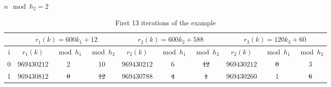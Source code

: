 \documentclass{article}
\begin{document}
{%
$n \mod h_2 = 2$ 
\begin{table}[H]
\centering
\caption{First 13 iterations of the example}
\label{table:b}
\begin{tabular}{|c|c|@{}c@{}|@{}c@{}|c|@{}c@{}|@{}c@{}|c|@{}c@{}|@{}c@{}|}
\hline
	& \multicolumn{3}{|c|}{$r_1(k) = 600k_1+12$} &  \multicolumn{3}{|c|}{$r_2(k) = 600k_2+588$} & \multicolumn{3}{|c|}{$r_3(k) = 120k_3+60$}	\\ \hline
i   & $r_1(k)$	& $\bmod h_1$	& $\bmod h_2$	& $r_2(k)$	& $\bmod h_1$	& $\bmod h_2$	& $r_2(k)$	& $\bmod h_1$	& $\bmod h_2$ \\ \hline
0	& $969430212$ & 2 & 10	& \sout{$969430212$} & 6 & \sout{12}	& \sout{$969430212$} & \sout{0} & 3	\\ \hline
1	& \sout{$969430812$} & \sout{0}	& \sout{12}	& \sout{$969430788 $} & \sout{4} & \sout{1}	& \sout{$969430260$} & 1 &	\sout{6}	\\ \hline

\end{tabular}
\end{table}}
\end{document}
